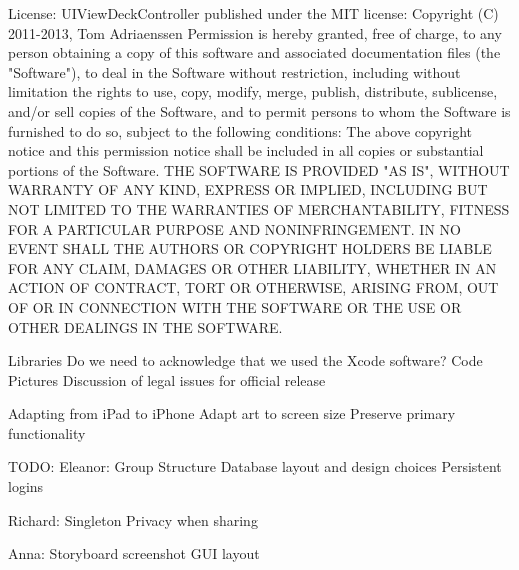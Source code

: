 \documentclass[a4wide, 10pt]{article}
\begin{document}
License:
UIViewDeckController published under the MIT license:
Copyright (C) 2011-2013, Tom Adriaenssen
Permission is hereby granted, free of charge, to any person obtaining a copy of this software and associated documentation files (the "Software"), to deal in the Software without restriction, including without limitation the rights to use, copy, modify, merge, publish, distribute, sublicense, and/or sell copies of the Software, and to permit persons to whom the Software is furnished to do so, subject to the following conditions:
The above copyright notice and this permission notice shall be included in all copies or substantial portions of the Software.
THE SOFTWARE IS PROVIDED "AS IS", WITHOUT WARRANTY OF ANY KIND, EXPRESS OR IMPLIED, INCLUDING BUT NOT LIMITED TO THE WARRANTIES OF MERCHANTABILITY, FITNESS FOR A PARTICULAR PURPOSE AND NONINFRINGEMENT. IN NO EVENT SHALL THE AUTHORS OR COPYRIGHT HOLDERS BE LIABLE FOR ANY CLAIM, DAMAGES OR OTHER LIABILITY, WHETHER IN AN ACTION OF CONTRACT, TORT OR OTHERWISE, ARISING FROM, OUT OF OR IN CONNECTION WITH THE SOFTWARE OR THE USE OR OTHER DEALINGS IN THE SOFTWARE.

	Libraries
Do we need to acknowledge that we used the Xcode software?
	Code
	Pictures
	Discussion of legal issues for official release

Adapting from iPad to iPhone
Adapt art to screen size
Preserve primary functionality

TODO:
Eleanor:
Group Structure
Database layout and design choices
Persistent logins

Richard:
Singleton
Privacy when sharing

Anna: 
Storyboard screenshot 
GUI layout
\end{document}
